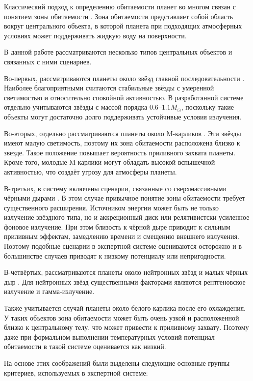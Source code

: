 \documentclass[14pt,a4paper]{extarticle}
\begin{document}
Классический подход к определению обитаемости планет во многом связан с понятием зоны обитаемости \cite{hand}. Зона обитаемости представляет собой область вокруг центрального объекта, в которой планета при подходящих атмосферных условиях может поддерживать жидкую воду на поверхности.

В данной работе рассматриваются несколько типов центральных объектов и связанных с ними сценариев.

Во-первых, рассматриваются планеты около звёзд главной последовательности \cite{hand}. Наиболее благоприятными считаются стабильные звёзды с умеренной светимостью и относительно спокойной активностью. В разработанной системе отдельно учитываются звёзды с массой порядка $0.6$--$1.1M_{\odot}$, поскольку такие объекты могут достаточно долго поддерживать устойчивые условия излучения.

Во-вторых, отдельно рассматриваются планеты около M-карликов \cite{hand}. Эти звёзды имеют малую светимость, поэтому их зона обитаемости расположена близко к звезде. Такое положение повышает вероятность приливного захвата планеты. Кроме того, молодые M-карлики могут обладать высокой вспышечной активностью, что создаёт угрозу для атмосферы планеты.

В-третьих, в систему включены сценарии, связанные со сверхмассивными чёрными дырами \cite{miller}. В этом случае привычное понятие зоны обитаемости требует существенного расширения. Источником энергии может быть не только излучение звёздного типа, но и аккреционный диск или релятивистски усиленное фоновое излучение. При этом близость к чёрной дыре приводит к сильным приливным эффектам, замедлению времени и смещению внешнего излучения. Поэтому подобные сценарии в экспертной системе оцениваются осторожно и в большинстве случаев приводят к низкому потенциалу или непригодности.

В-четвёртых, рассматриваются планеты около нейтронных звёзд \cite{neutron} и малых чёрных дыр \cite{miller}. Для нейтронных звёзд существенными факторами являются рентгеновское излучение и гамма-излучение.

Также учитывается случай планеты около белого карлика после его охлаждения. У таких объектов зона обитаемости может быть очень узкой и расположенной близко к центральному телу, что может привести к приливному захвату. Поэтому даже при формальном выполнении температурных условий потенциал обитаемости в такой системе оценивается как низкий.

На основе этих соображений были выделены следующие основные группы критериев, используемых в экспертной системе:
\end{document}
